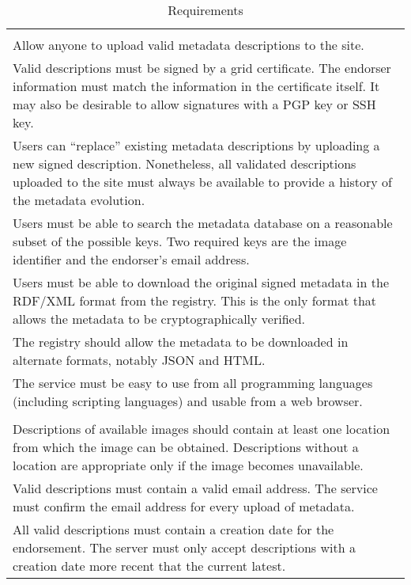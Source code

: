 \begin{table}
\caption{Requirements}
\label{tab:requirements}
\begin{center}
\begin{tabular}{p{}}
\hline\hline

\\ Allow anyone to upload valid metadata descriptions to the site.

\\ Valid descriptions must be signed by a grid certificate.  The
  endorser information must match the information in the certificate
  itself.  It may also be desirable to allow signatures with a PGP key
  or SSH key.

\\ Users can ``replace'' existing metadata descriptions by
  uploading a new signed description.  Nonetheless, all validated
  descriptions uploaded to the site must always be available to
  provide a history of the metadata evolution.

\\ Users must be able to search the metadata database on a
  reasonable subset of the possible keys.  Two required keys are the
  image identifier and the endorser's email address.

\\ Users must be able to download the original signed metadata in
  the RDF/XML format from the registry.  This is the only format that
  allows the metadata to be cryptographically verified.

\\ The registry should allow the metadata to be downloaded in
  alternate formats, notably JSON and HTML.

\\ The service must be easy to use from all programming languages
  (including scripting languages) and usable from a web browser.

\\ \hline 
\\
  Descriptions of available images should contain at least one
  location from which the image can be obtained.  Descriptions without
  a location are appropriate only if the image becomes unavailable.

\\ Valid descriptions must contain a valid email address.  The
  service must confirm the email address for every upload of metadata.

\\ All valid descriptions must contain a creation date for the
  endorsement.  The server must only accept descriptions with a
  creation date more recent that the current latest.


\end{tabular}
\end{center}
\end{table}
